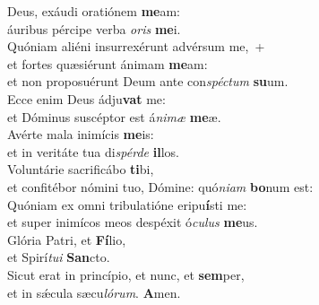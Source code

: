 \evenverse Deus, exáudi oratiónem \textbf{me}am:~\*\\
\evenverse áuribus pércipe verba \textit{o}\textit{ris} \textbf{me}i.\\
\oddverse Quóniam aliéni insurrexérunt advérsum me,~+\\
\oddverse  et fortes quæsiérunt ánimam \textbf{me}am:~\*\\
\oddverse et non proposuérunt Deum ante con\textit{spé}\textit{ctum} \textbf{su}um.\\
\evenverse Ecce enim Deus ádju\textbf{vat} me:~\*\\
\evenverse et Dóminus suscéptor est á\textit{ni}\textit{mæ} \textbf{me}æ.\\
\oddverse Avérte mala inimícis \textbf{me}is:~\*\\
\oddverse et in veritáte tua di\textit{spér}\textit{de} \textbf{il}los.\\
\evenverse Voluntárie sacrificábo \textbf{ti}bi,~\*\\
\evenverse et confitébor nómini tuo, Dómine: quó\textit{ni}\textit{am} \textbf{bo}num est:\\
\oddverse Quóniam ex omni tribulatióne eripu\textbf{í}sti me:~\*\\
\oddverse et super inimícos meos despéxit ó\textit{cu}\textit{lus} \textbf{me}us.\\
\evenverse Glória Patri, et \textbf{Fí}lio,~\*\\
\evenverse et Spirí\textit{tu}\textit{i} \textbf{San}cto.\\
\oddverse Sicut erat in princípio, et nunc, et \textbf{sem}per,~\*\\
\oddverse et in sǽcula sæcu\textit{ló}\textit{rum}. \textbf{A}men.\\
